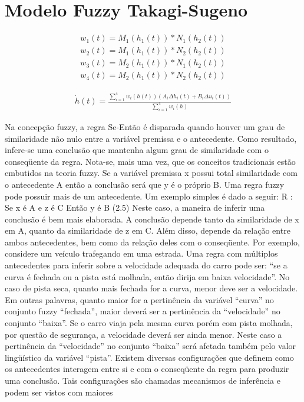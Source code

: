 \section{Modelo Fuzzy Takagi-Sugeno}
\label{secTakSug}

	\begin{equation}
	\begin{aligned}
		w_{1}(t) = M_1(h_1(t)) * N_1(h_2(t)) \\
		w_{2}(t) = M_1(h_1(t)) * N_2(h_2(t)) \\
		w_{3}(t) = M_2(h_1(t)) * N_1(h_2(t)) \\
		w_{4}(t) = M_2(h_1(t)) * N_2(h_2(t))
	\end{aligned}
	\end{equation}
	
	\begin{align}
		\dot{h}(t) = \frac{\sum_{i=1}^{4}  w_i(h(t))(A_i \Delta h_i(t) +  B_i \Delta u_i(t))}{\sum_{i=1}^{4} w_i(h)}
	\end{align}

Na concepção fuzzy, a regra Se-Então é disparada quando houver um grau de similaridade
não nulo entre a variável premissa e o antecedente. Como resultado, infere-se uma conclusão
que mantenha algum grau de similaridade com o conseqüente da regra. Nota-se, mais uma
vez, que os conceitos tradicionais estão embutidos na teoria fuzzy. Se a variável premissa x
possui total similaridade com o antecedente A então a conclusão será que y é o próprio B.
Uma regra fuzzy pode possuir mais de um antecedente. Um exemplo simples é dado a
seguir:
R :
Se x é A e z é C
Então y é B
(2.5)
Neste caso, a maneira de inferir uma conclusão é bem mais elaborada. A conclusão depende
tanto da similaridade de x em A, quanto da similaridade de z em C. Além disso, depende da
relação entre ambos antecedentes, bem como da relação deles com o conseqüente.
Por exemplo, considere um veículo trafegando em uma estrada. Uma regra com múltiplos
antecedentes para inferir sobre a velocidade adequada do carro pode ser: “se a curva é fechada
ou a pista está molhada, então dirija em baixa velocidade”.
No caso de pista seca, quanto mais fechada for a curva, menor deve ser a velocidade.
Em outras palavras, quanto maior for a pertinência da variável “curva” no conjunto fuzzy
“fechada”, maior deverá ser a pertinência da “velocidade” no conjunto “baixa”.
Se o carro viaja pela mesma curva porém com pista molhada, por questão de segurança,
a velocidade deverá ser ainda menor. Neste caso a pertinência da “velocidade” no conjunto
“baixa” será afetada também pelo valor lingüístico da variável “pista”.
Existem diversas configurações que definem como os antecedentes interagem entre si e
com o conseqüente da regra para produzir uma conclusão. Tais configurações são chamadas
mecanismos de inferência e podem ser vistos com maiores

